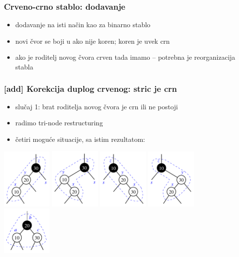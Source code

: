 \documentclass[compress]{beamer}
\begin{document}
\begin{frame}[fragile]
  \frametitle{Crveno-crno stablo: dodavanje}
  \begin{itemize}
    \item dodavanje na isti način kao za binarno stablo 
    \item novi čvor se boji u  ako nije koren; koren je uvek crn
      \item ako je roditelj novog čvora crven tada imamo  -- potrebna je reorganizacija stabla
  \end{itemize}
\end{frame}

\begin{frame}[fragile]
  \frametitle{[add] Korekcija duplog crvenog: stric je crn}
  \begin{itemize}
    \item slučaj 1: brat roditelja novog čvora je crn ili ne postoji
    \item radimo tri-node restructuring
    \item četiri moguće situacije, sa istim rezultatom:
  \end{itemize}
  \begin{center}
    \includegraphics[width=2.5cm]{asp-11-pic39a.pdf}
    \includegraphics[width=2.5cm]{asp-11-pic39b.pdf}
    \includegraphics[width=2.5cm]{asp-11-pic39c.pdf}
    \includegraphics[width=2.5cm]{asp-11-pic39d.pdf} \\
    \includegraphics[width=2.5cm]{asp-11-pic39e.pdf}
  \end{center}
\end{frame}
\end{document}
